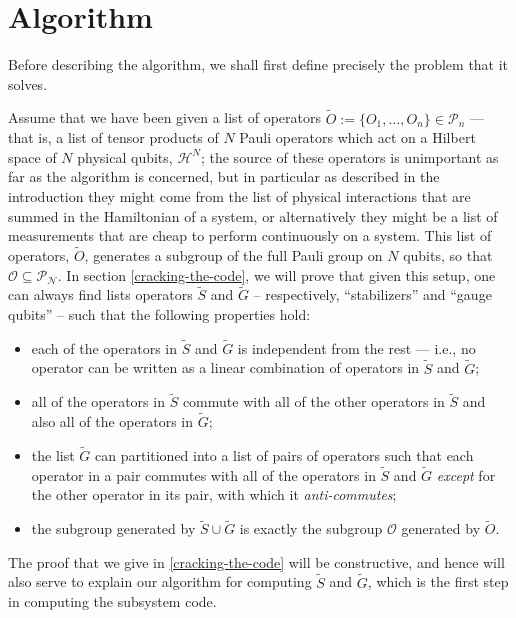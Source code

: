 \documentclass[twocolumn,showpacs,preprintnumbers,amsmath,amssymb,nofootinbib,pra,floatfix]{revtex4}
\begin{document}
\section{Algorithm}

Before describing the algorithm, we shall first define precisely the problem that it solves.

Assume that we have been given a list of operators $\tilde O :=\{O_1,\dots,O_n\}\in \mathcal{P}_n$ --- that is, a list of tensor products of $N$ Pauli operators which act on a Hilbert space of $N$ physical qubits, $\mathscr{H}^N$;  the source of these operators is unimportant as far as the algorithm is concerned, but in particular as described in the introduction they might come from the list of physical interactions that are summed in the Hamiltonian of a system, or alternatively they might be a list of measurements that are cheap to perform continuously on a system.  This list of operators, $\tilde O$, generates a subgroup of the full Pauli group on $N$ qubits, so that $\mathcal{O}\subseteq\mathcal{P_N}$.  In section \ref{cracking-the-code}, we will prove that given this setup, one can always find lists operators $\tilde S$ and $\tilde G$ -- respectively, ``stabilizers'' and ``gauge qubits'' -- such that the following properties hold:
\begin{itemize}
\item each of the operators in $\tilde S$ and $\tilde G$ is independent from the rest --- i.e., no operator can be written as a linear combination of operators in $\tilde S$ and $\tilde G$;
\item all of the operators in $\tilde S$ commute with all of the other operators in $\tilde S$ and also all of the operators in $\tilde G$;
\item the list $\tilde G$ can partitioned into a list of pairs of operators such that each operator in a pair commutes with all of the operators in $\tilde S$ and $\tilde G$ \emph{except} for the other operator in its pair, with which it \emph{anti-commutes};
\item the subgroup generated by $\tilde S \cup \tilde G$ is exactly the subgroup $\mathcal{O}$ generated by $\tilde O$.
\end{itemize}
The proof that we give in \ref{cracking-the-code} will be constructive, and hence will also serve to explain our algorithm for computing $\tilde S$ and $\tilde G$, which is the first step in computing the subsystem code.
\end{document}
